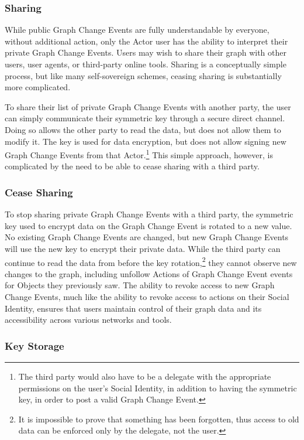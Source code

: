 \documentclass[12pt,letterpaper]{article}
\begin{document}
\subsubsection{Sharing}

While public Graph Change Events are fully understandable by everyone, without additional
action, only the Actor user has the ability to interpret their private Graph Change
Events. Users may wish to share their graph with other users, user agents, or third-party
online tools. Sharing is a conceptually simple process, but like many self-sovereign
schemes, ceasing sharing is substantially more complicated.

To share their list of private Graph Change Events with another party, the user can simply
communicate their symmetric key through a secure direct channel. Doing so allows the other
party to read the data, but does not allow them to modify it. The key is used for data
encryption, but does not allow signing new Graph Change Events from that Actor.\footnote{The
  third party would also have to be a delegate with the appropriate permissions on the
  user’s Social Identity, in addition to having the symmetric key, in order to post a valid
  Graph Change Event.} This simple approach, however, is complicated by the need to be able
to cease sharing with a third party.

\subsubsection{Cease Sharing}

To stop sharing private Graph Change Events with a third party, the symmetric key used to
encrypt data on the Graph Change Event is rotated to a new value. No existing Graph Change
Events are changed, but new Graph Change Events will use the new key to encrypt their
private data. While the third party can continue to read the data from before the key
rotation,\footnote{It is impossible to prove that something has been forgotten, thus access
  to old data can be enforced only by the delegate, not the user.} they cannot observe new
changes to the graph, including unfollow Actions of Graph Change Event events for Objects
they previously saw. The ability to revoke access to new Graph Change Events, much like the
ability to revoke access to actions on their Social Identity, ensures that users maintain
control of their graph data and its accessibility across various networks and tools.

\subsubsection{Key Storage}
\end{document}
